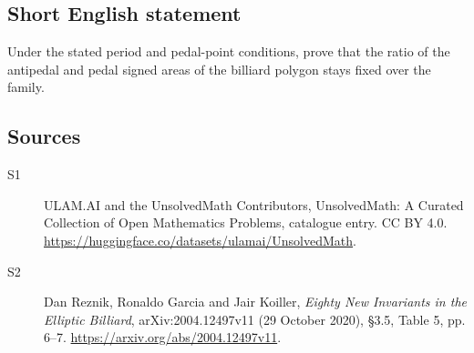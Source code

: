 \documentclass[11pt]{article}
\begin{document}
\subsection{Short English statement}
Under the stated period and pedal-point conditions, prove that the ratio of the antipedal and pedal signed areas of the billiard polygon stays fixed over the family.
\subsection{Sources}
\begin{description}
\item[\hypertarget{source:statement:1}{S1}] ULAM.AI and the UnsolvedMath Contributors, UnsolvedMath: A Curated Collection of Open Mathematics Problems, catalogue entry. CC BY 4.0. \url{https://huggingface.co/datasets/ulamai/UnsolvedMath}.
\item[\hypertarget{source:statement:2}{S2}] Dan Reznik, Ronaldo Garcia and Jair Koiller, \emph{Eighty New Invariants in the Elliptic Billiard}, arXiv:2004.12497v11 (29 October 2020), \S3.5, Table 5, pp. 6--7. \url{https://arxiv.org/abs/2004.12497v11}.
\end{description}
\label{end:statement}
\end{document}
